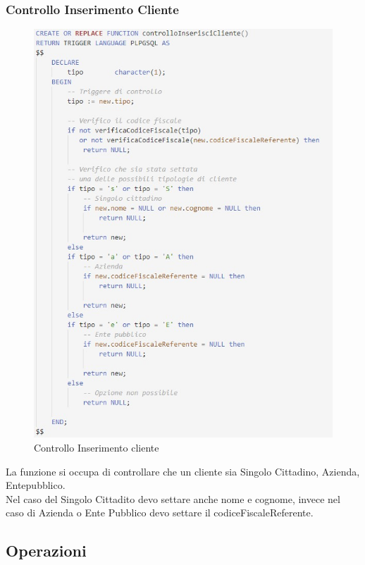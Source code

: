 \documentclass[legalpaper]{article}
\begin{document}
	\subsubsection{Controllo Inserimento Cliente}
		\begin{figure}[h]
			\centering
			\includegraphics[width=0.9\linewidth]{Immagini SQL/controlloInserimentoCliente}
			\caption{Controllo Inserimento cliente}
			\label{controlloInserimentoClientesql}
		\end{figure}
		La funzione si occupa di controllare che un cliente sia Singolo Cittadino, Azienda, Entepubblico.\\
		Nel caso del Singolo Cittadito devo settare anche nome e cognome, invece nel caso di Azienda o Ente Pubblico devo settare il codiceFiscaleReferente.\\
\newpage
\subsection{Operazioni}
\end{document}
